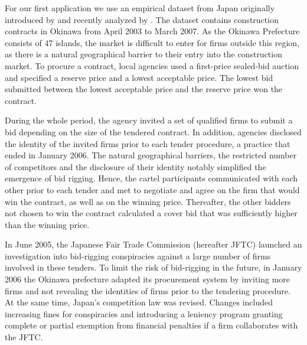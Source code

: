 \documentclass[a4paper,11pt]{article}
\begin{document}
	For our first application we use an empirical dataset from Japan originally introduced by \cite{ishii2014bid} and recently analyzed by \cite{huber2020transnational}. The dataset contains construction contracts in Okinawa from April 2003 to March 2007. As the Okinawa Prefecture consists of 47 islands, the market is difficult to enter for firms outside this region, as there is a natural geographical barrier to their entry into the construction market. To procure a contract, local agencies used a first-price sealed-bid auction and specified a reserve price and a lowest acceptable price. The lowest bid submitted between the lowest acceptable price and the reserve price won the contract.
	
	During the whole period, the agency invited a set of qualified firms to submit a bid depending on the size of the tendered contract. In addition, agencies disclosed the identity of the invited firms prior to each tender procedure, a practice that ended in January 2006. The natural geographical barriers, the restricted number of competitors and the disclosure of their identity notably simplified the emergence of bid rigging. Hence, the cartel participants communicated with each other prior to each tender and met to negotiate and agree on the firm that would win the contract, as well as on the winning price. Thereafter, the other bidders not chosen to win the contract calculated a cover bid that was sufficiently higher than the winning price.
	
	In June 2005, the Japanese Fair Trade Commission (hereafter JFTC) launched an investigation into bid-rigging conspiracies against a large number of firms involved in these tenders. To limit the risk of bid-rigging in the future, in January 2006 the Okinawa prefecture adapted its procurement system by inviting more firms and not revealing the identities of firms prior to the tendering procedure. At the same time, Japan’s competition law was revised. Changes included increasing fines for conspiracies and introducing a leniency program granting complete or partial exemption from financial penalties if a firm collaborates with the JFTC. 
	
\end{document}
